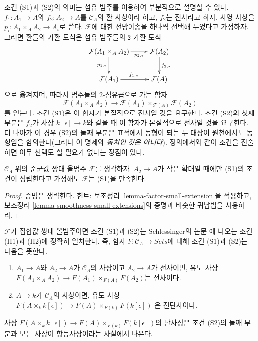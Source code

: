 \noindent
조건 (S1)과 (S2)의 의미는 섬유 범주를 이용하여 부분적으로
설명할 수 있다. $f_1 : A_1 \to A$와 $f_2 : A_2 \to A$를
$\mathcal{C}_\Lambda$의 환 사상이라 하고, $f_2$는 전사라고 하자.
사영 사상을 $p_i : A_1 \times_A A_2 \to A_i$로 쓴다.
$\mathcal{F}$에 대한 전방이송을 하나씩 선택해 두었다고 가정하자.
그러면 환들의 가환 도식은 섬유 범주들의 $2$-가환 도식
$$
\xymatrix{
\mathcal{F}(A_1 \times_A A_2) \ar[r]_-{p_{2, *}} \ar[d]_{p_{1, *}} &
\mathcal{F}(A_2) \ar[d]^{f_{2, *}} \\
\mathcal{F}(A_1) \ar[r]^{f_{1, *}} & \mathcal{F}(A)
}
$$
으로 옮겨지며, 따라서 범주들의 $2$-섬유곱으로 가는 함자
\begin{equation}
\label{equation-compare}
\mathcal{F}(A_1 \times_A A_2) \to
\mathcal{F}(A_1) \times_{\mathcal{F}(A)} \mathcal{F}(A_2)
\end{equation}
를 얻는다. 조건 (S1)은 이 함자가 본질적으로 전사일 것을 요구한다.
조건 (S2)의 첫째 부분은 $f_2$가 사상 $k[\epsilon] \to k$와
같을 때 이 함자가 본질적으로 전사일 것을 요구한다.
더 나아가 이 경우 (S2)의 둘째 부분은 표적에서 동형이 되는 두 대상이
원천에서도 동형임을 함의한다(그러나 이 명제와 {\it 동치인 것은 아니다}).
정의에서와 같이 조건을 진술하면 아무 선택도 할 필요가 없다는 장점이 있다.

\begin{lemma}
\label{lemma-S1-small-extensions}
$\mathcal C_\Lambda$ 위의 준군값 쌍대 올범주 $\mathcal{F}$를
생각하자. $A_2 \to A$가 작은 확대일 때에만 (S1)의 조건이
성립한다고 가정해도 $\mathcal{F}$는 (S1)을 만족한다.
\end{lemma}

\begin{proof}
증명은 생략한다. 힌트: 보조정리 \ref{lemma-factor-small-extension}을
적용하고, 보조정리 \ref{lemma-smoothness-small-extensions}의
증명과 비슷한 귀납법을 사용하라.
\end{proof}

\begin{remark}
\label{remark-compare-S1-S2-schlessinger}
$\mathcal{F}$가 집합값 쌍대 올범주이면 조건 (S1)과 (S2)는
Schlessinger의 논문 \cite{Sch}에 나오는 조건 (H1)과 (H2)에
정확히 일치한다. 즉, 함자
$F: \mathcal{C}_\Lambda \to \textit{Sets}$에 대해 조건
(S1)과 (S2)는 다음을 뜻한다.
\begin{enumerate}
\item [(S1)] $A_1 \to A$와 $A_2 \to A$가
$\mathcal{C}_\Lambda$의 사상이고 $A_2 \to A$가 전사이면,
유도 사상 $F(A_1 \times_A A_2) \to
F(A_1) \times_{F(A)} F(A_2)$는 전사이다.
\item [(S2)] $A \to k$가 $\mathcal{C}_\Lambda$의 사상이면,
유도 사상
$F(A \times_k k[\epsilon]) \to F(A) \times_{F(k)} F(k[\epsilon])$
은 전단사이다.
\end{enumerate}
사상 $F(A \times_k k[\epsilon]) \to
F(A) \times_{F(k)} F(k[\epsilon])$의 단사성은 조건 (S2)의
둘째 부분과 모든 사상이 항등사상이라는 사실에서 나온다.
\end{remark}

